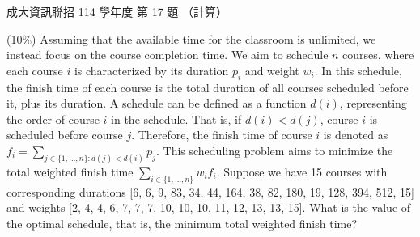 \begin{pastexam}[label={px:ncku-114-prog-17}]{成大資訊聯招 114 學年度 第 17 題}
（計算）

(10\%) Assuming that the available time for the classroom is unlimited, we instead focus on the course completion time. We aim to schedule $n$ courses, where each course $i$ is characterized by its duration $p_i$ and weight $w_i$. In this schedule, the finish time of each course is the total duration of all courses scheduled before it, plus its duration. A schedule can be defined as a function $d(i)$, representing the order of course $i$ in the schedule. That is, if $d(i)<d(j)$, course $i$ is scheduled before course $j$. Therefore, the finish time of course $i$ is denoted as $f_i=\sum_{j\in\{1,\ldots,n\}:d(j)<d(i)}p_j$. This scheduling problem aims to minimize the total weighted finish time $\sum_{i\in\{1,\ldots,n\}}w_if_i$. Suppose we have 15 courses with corresponding durations [6, 6, 9, 83, 34, 44, 164, 38, 82, 180, 19, 128, 394, 512, 15] and weights [2, 4, 4, 6, 7, 7, 7, 10, 10, 10, 11, 12, 13, 13, 15]. What is the value of the optimal schedule, that is, the minimum total weighted finish time?
\end{pastexam}

